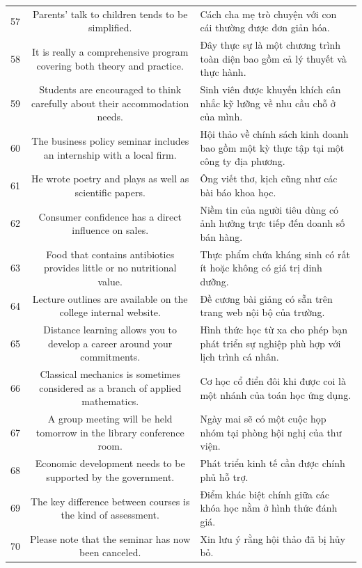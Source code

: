 \documentclass[11pt,a4paper]{article}
\begin{document}
\begin{longtable}{N S M}
57 & Parents' talk to children tends to be simplified. & Cách cha mẹ trò chuyện với con cái thường được đơn giản hóa. \\
58 & It is really a comprehensive program covering both theory and practice. & Đây thực sự là một chương trình toàn diện bao gồm cả lý thuyết và thực hành. \\
59 & Students are encouraged to think carefully about their accommodation needs. & Sinh viên được khuyến khích cân nhắc kỹ lưỡng về nhu cầu chỗ ở của mình. \\
60 & The business policy seminar includes an internship with a local firm. & Hội thảo về chính sách kinh doanh bao gồm một kỳ thực tập tại một công ty địa phương. \\
61 & He wrote poetry and plays as well as scientific papers. & Ông viết thơ, kịch cũng như các bài báo khoa học. \\
62 & Consumer confidence has a direct influence on sales. & Niềm tin của người tiêu dùng có ảnh hưởng trực tiếp đến doanh số bán hàng. \\
63 & Food that contains antibiotics provides little or no nutritional value. & Thực phẩm chứa kháng sinh có rất ít hoặc không có giá trị dinh dưỡng. \\
64 & Lecture outlines are available on the college internal website. & Đề cương bài giảng có sẵn trên trang web nội bộ của trường. \\
65 & Distance learning allows you to develop a career around your commitments. & Hình thức học từ xa cho phép bạn phát triển sự nghiệp phù hợp với lịch trình cá nhân. \\
66 & Classical mechanics is sometimes considered as a branch of applied mathematics. & Cơ học cổ điển đôi khi được coi là một nhánh của toán học ứng dụng. \\
67 & A group meeting will be held tomorrow in the library conference room. & Ngày mai sẽ có một cuộc họp nhóm tại phòng hội nghị của thư viện. \\
68 & Economic development needs to be supported by the government. & Phát triển kinh tế cần được chính phủ hỗ trợ. \\
69 & The key difference between courses is the kind of assessment. & Điểm khác biệt chính giữa các khóa học nằm ở hình thức đánh giá. \\
70 & Please note that the seminar has now been canceled. & Xin lưu ý rằng hội thảo đã bị hủy bỏ. \\

\end{longtable}
\end{document}
